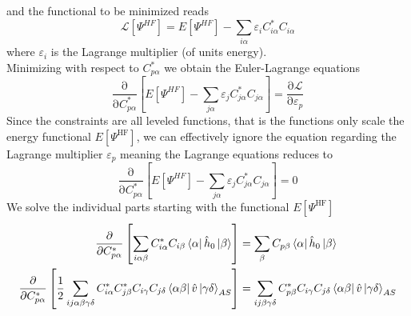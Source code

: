 \documentclass[a4paper, hidelinks, 10pt]{article}
\newcommand{\prtl}{\mathrm{\partial}} %
\begin{document}
    and the functional to be minimized reads
        \begin{equation}
            \mathcal{L}\left[\Psi^{HF}\right] = E\left[\Psi^{HF}\right] -
            \sum_{i\alpha}\varepsilon_iC^{*}_{i\alpha}C_{i\alpha}
            \label{eq:HFFuncMinimize}
        \end{equation}
    where $\varepsilon_i$ is the Lagrange multiplier (of units energy). \\
    Minimizing with respect to $C^{*}_{p\alpha}$ we obtain the Euler-Lagrange
    equations
        \begin{equation}
            \frac{\prtl}{\prtl C^{*}_{p\alpha}}\left[ E\left[\Psi^{HF}\right] -
            \sum_{j\alpha}\varepsilon_jC^{*}_{j\alpha}C_{j\alpha}\right] =
            \frac{\prtl\mathcal{L}}{\prtl\varepsilon_p}
            \label{eq:HFEulerLagrangeEQ}
        \end{equation}
    Since the constraints are all leveled functions, that is the functions only
    scale the energy functional $E[\Psi^{\text{HF}}]$, we can effectively
    ignore the equation regarding the Lagrange multiplier $\varepsilon_p$
    meaning the Lagrange equations reduces to
        \begin{equation}
            \frac{\prtl}{\prtl C^{*}_{p\alpha}}\left[ E\left[\Psi^{HF}\right] -
            \sum_{j\alpha}\varepsilon_jC^{*}_{j\alpha}C_{j\alpha}\right] = 0
            \label{eq:HFLagrangeEQ}
        \end{equation}
    We solve the individual parts starting with the functional
    $E[\Psi^{\text{HF}}]$
        \begin{equation}
            \begin{aligned}
                \frac{\prtl}{\prtl C^{*}_{p\alpha}} \left[\sum_{i\alpha\beta}
                C^{*}_{i\alpha}C_{i\beta}
                \bra{\alpha}\hat{h}_0\ket{\beta}\right] &=
                \sum_{\beta}C_{p\beta}\bra{\alpha}\hat{h}_0\ket{\beta} \\
                \frac{\prtl}{\prtl C^{*}_{p\alpha}}
                \left[\frac{1}{2}\sum_{ij\alpha\beta\gamma\delta}
                C^{*}_{i\alpha}C^{*}_{j\beta}C_{i\gamma}C_{j\delta}
                \bra{\alpha\beta}\hat{v}\ket{\gamma\delta}_{AS}\right] &=
                \sum_{ij\beta\gamma\delta}
                C^{*}_{p\beta}C_{i\gamma}C_{j\delta}
                \bra{\alpha\beta}\hat{v}\ket{\gamma\delta}_{AS}
            \end{aligned}
            \label{eq:HFderEFunc}
        \end{equation}
\end{document}
